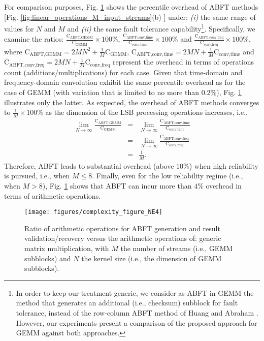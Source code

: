 \documentclass[twocolumn,english,onecolumn]{IEEEtran}
\theoremstyle{plain}
\theoremstyle{plain}
\begin{document}
For comparison purposes, Fig. \ref{fig:ECC-cost-vs.GEMM} shows the
percentile overhead of ABFT methods {[}Fig. \ref{fig:linear_operations_M_input_streams}(b)
\cite{bosilca2009algorithm,chen2005fault,murray2008spread}{]} under:
\emph{(i)} the same range of values for $N$ and $M$ and \emph{(ii)}
the same fault tolerance capability\footnote{In order to keep our treatment generic, we consider as ABFT in GEMM
the method that generates an additional (i.e., checksum) subblock
for fault tolerance, instead of the row-column ABFT method of Huang
and Abraham \cite{huang1984algorithm}. However, our experiments present
a comparison of the proposed approach for GEMM against both approaches. }. Specifically, we examine the ratios: $\frac{\mathrm{C}_{\text{ABFT,GEMM}}}{\mathrm{C}_{\text{GEMM}}}\times100\%$,
$\frac{\mathrm{C}_{\text{ABFT,conv,time}}}{\mathrm{C}_{\text{conv,time}}}\times100\%$
and $\frac{\mathrm{C}_{\text{ABFT,conv,freq}}}{\mathrm{C}_{\text{conv,freq}}}\times100\%$,
where $\mathrm{C}_{\text{ABFT,GEMM}}=2MN^{2}+\frac{1}{M}\mathrm{C}_{\text{GEMM}}$,
$\mathrm{C}_{\text{ABFT,conv,time}}=2MN+\frac{1}{M}\mathrm{C}_{\text{conv,time}}$
and $\mathrm{C}_{\text{ABFT,conv,freq}}=2MN+\frac{1}{M}\mathrm{C}_{\text{conv,freq}}$
represent the overhead in terms of operations count (additions/multiplications)
for each case. Given that time-domain and frequency-domain convolution
exhibit the same percentile overhead as for the case of GEMM (with
variation that is limited to no more than $0.2\%$), Fig. \ref{fig:ECC-cost-vs.GEMM}
illustrates only the latter. As expected, the overhead of ABFT methods
converges to $\frac{1}{M}\times100\%$ as the dimension of the LSB
processing operations increases, i.e., 
\begin{eqnarray}
\lim_{N\rightarrow\infty}\frac{\mathrm{C}_{\text{ABFT,GEMM}}}{\mathrm{C}_{\text{GEMM}}} & = & \lim_{N\rightarrow\infty}\frac{\mathrm{C}_{\text{ABFT,conv,time}}}{\mathrm{C}_{\text{conv,time}}}\nonumber \\
 & = & \lim_{N\rightarrow\infty}\frac{\mathrm{C}_{\text{ABFT,conv,freq}}}{\mathrm{C}_{\text{conv,freq}}}\\
 & = & \frac{1}{M}.\nonumber 
\end{eqnarray}
Therefore, ABFT leads to substantial overhead (above $10\%$) when
high reliability is pursued, i.e., when $M\leq8$. Finally, even for
the low reliability regime (i.e., when $M>8$), Fig. \ref{fig:ECC-cost-vs.GEMM}
shows that ABFT can incur more than $4\%$ overhead in terms of arithmetic
operations. 

\begin{figure}[tbh]
\begin{centering}
\texttt{[image: figures/complexity\_figure\_NE4]}
\par\end{centering}

\protect\caption{Ratio of arithmetic operations for ABFT generation and result validation/recovery
versus the arithmetic operations of: generic matrix multiplication,
with $M$ the number of streams (i.e., GEMM subblocks) and $N$ the
kernel size (i.e., the dimension of GEMM subblocks). \label{fig:ECC-cost-vs.GEMM}}
\end{figure}
\end{document}
